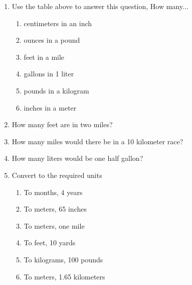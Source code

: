 \begin{enumerate}[itemsep=1.5cm]

\item Use the table above to answer this question, How many...
  \begin{multicols}{2}
    \begin{enumerate}[itemsep=1cm]
      \item centimeters in an inch
      \item ounces in a pound
      \item feet in a mile
      \item gallons in 1 liter
      \item pounds in a kilogram
      \item inches in a meter
    \end{enumerate}
  \end{multicols}

  \item How many feet are in two miles?
  \item How many miles would there be in a 10 kilometer race?
  \item How many liters would be one half gallon?
  
\item Convert to the required units
  \begin{multicols}{2}
    \begin{enumerate}[itemsep=3cm]
      \item To months, 4 years
      \item To meters, 65 inches
      \item To meters, one mile
      \item To feet, 10 yards
      \item To kilograms, 100 pounds
      \item To meters, 1.65 kilometers
    \end{enumerate}
  \end{multicols}
  

\end{enumerate}
